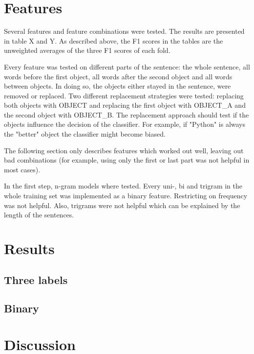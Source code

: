 \section{Features}
Several features and feature combinations were tested. The results are presented in table X and Y. As described above, the F1 scores in the tables are the unweighted averages of the three F1 scores of each fold.

Every feature was tested on different parts of the sentence: the whole sentence, all words before the first object, all words after the second object and all words between objects. In doing so, the objects either stayed in the sentence, were removed or replaced. Two different replacement strategies were tested: replacing both objects with OBJECT and replacing the first object with OBJECT\_A and the second object with OBJECT\_B. The replacement approach should test if the objects influence the decision of the classifier. For example, if "Python" is always the "better" object the classifier might become biased.

The following section only describes features which worked out well, leaving out bad combinations (for example, using only the first or last part was not helpful in most cases).\newline

In the first step, n-gram models where tested. Every uni-, bi and trigram in the whole training set was implemented as a binary feature. Restricting on frequency was not helpful. Also, trigrams were not helpful which can be explained by the length of the sentences.



\section{Results}


\subsection{Three labels}
\subsection{Binary}

\section{Discussion}